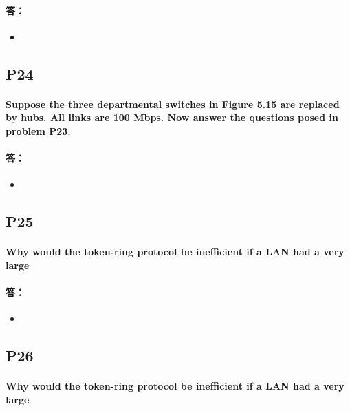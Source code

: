 \documentclass[a4paper]{ctexart}
\begin{document}
\paragraph*{答：} 
\begin{itemize}
    \item 
\end{itemize}

\subsection*{P24}
\paragraph*{Suppose the three departmental switches in Figure 5.15 are replaced by hubs. All links are 100 Mbps. Now answer the questions posed in problem P23.\\}
\paragraph*{答：} 
\begin{itemize}
    \item 
\end{itemize}

\subsection*{P25}
\paragraph*{Why would the token-ring protocol be inefficient if a LAN had a very large\\}
\paragraph*{答：} 
\begin{itemize}
    \item 
\end{itemize}

\subsection*{P26}
\paragraph*{Why would the token-ring protocol be inefficient if a LAN had a very large\\}
\end{document}
